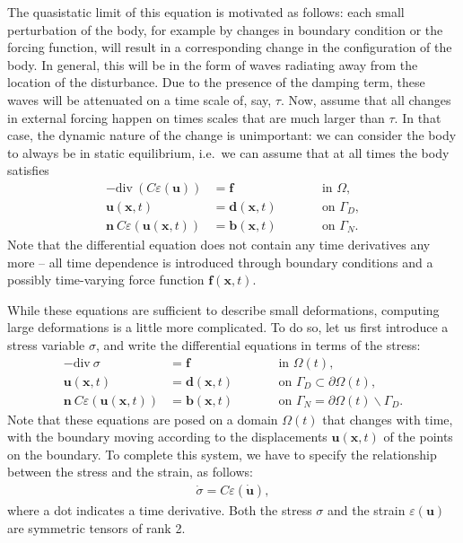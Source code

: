 \documentclass{article}
\renewcommand{\vec}[1]{\mathbf{#1}}
\renewcommand{\div}{\mathrm{div}\ }
\begin{document}
The quasistatic limit of this equation is motivated as follows: each small
perturbation of the body, for example by changes in boundary condition or the
forcing function, will result in a corresponding change in the configuration
of the body. In general, this will be in the form of waves radiating away from
the location of the disturbance. Due to the presence of the damping term,
these waves will be attenuated on a time scale of, say, $\tau$. Now, assume
that all changes in external forcing happen on times scales that are
much larger than $\tau$. In that case, the dynamic nature of the change is
unimportant: we can consider the body to always be in static equilibrium,
i.e.~we can assume that at all times the body satisfies
\begin{align}
  - \div ( C \varepsilon(\vec u)) &= \vec f
  &&\text{in $\Omega$},
  \\
  \vec u(\vec x,t) &= \vec d(\vec x,t)
  \qquad
  &&\text{on $\Gamma_D$},
  \\
  \vec n \ C \varepsilon(\vec u(\vec x,t)) &= \vec b(\vec x,t)
  \qquad
  &&\text{on $\Gamma_N$}.
\end{align}
Note that the differential equation does not contain any time derivatives any
more -- all time dependence is introduced through boundary conditions and a
possibly time-varying force function $\vec f(\vec x,t)$.

While these equations are sufficient to describe small deformations, computing
large deformations is a little more complicated. To do so, let us first
introduce a stress variable $\sigma$, and write the differential equations in
terms of the stress:
\begin{align}
  - \div \sigma &= \vec f
  &&\text{in $\Omega(t)$},
  \\
  \vec u(\vec x,t) &= \vec d(\vec x,t)
  \qquad
  &&\text{on $\Gamma_D\subset\partial\Omega(t)$},
  \\
  \vec n \ C \varepsilon(\vec u(\vec x,t)) &= \vec b(\vec x,t)
  \qquad
  &&\text{on $\Gamma_N=\partial\Omega(t)\backslash\Gamma_D$}.
\end{align}
Note that these equations are posed on a domain $\Omega(t)$ that
changes with time, with the boundary moving according to the
displacements $\vec u(\vec x,t)$ of the points on the boundary. To
complete this system, we have to specify the relationship between the
stress and the strain, as follows:
\begin{align}
  \label{eq:stress-strain}
  \dot\sigma = C \varepsilon (\dot{\vec u}),
\end{align}
where a dot indicates a time derivative. Both the stress $\sigma$ and the
strain $\varepsilon(\vec u)$ are symmetric tensors of rank 2.
\end{document}
